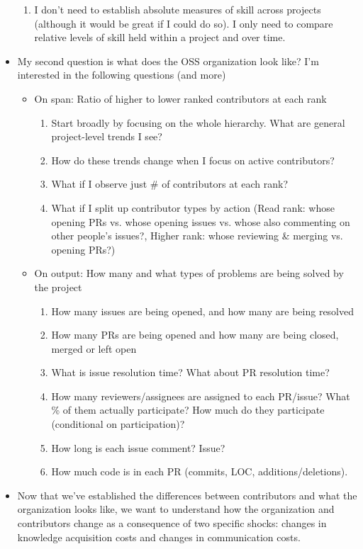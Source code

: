 \documentclass[source/paper/main.tex]{subfiles}
\begin{document}
\begin{itemize}
\begin{enumerate}
        \item I don't need to establish absolute measures of skill across projects (although it would be great if I could do so). I only need to compare relative levels of skill held within a project and over time. 
    \end{enumerate}
    \item My second question is what does the OSS organization look like? I'm interested in the following questions (and more)
    \begin{itemize}
        \item On span: Ratio of higher to lower ranked contributors at each rank
        \begin{enumerate}
            \item Start broadly by focusing on the whole hierarchy. What are general project-level trends I see?
            \item How do these trends change when I focus on active contributors?
            \item What if I observe just \# of contributors at each rank?
            \item What if I split up contributor types by action (Read rank: whose opening PRs vs. whose opening issues vs. whose also commenting on other people's issues?, Higher rank: whose reviewing \& merging vs. opening PRs?)
    \end{enumerate}
        \item On output: How many and what types of problems are being solved by the project
        \begin{enumerate}
            \item How many issues are being opened, and how many are being resolved
            \item How many PRs are being opened and how many are being closed, merged or left open
            \item What is issue resolution time? What about PR resolution time?
            \item How many reviewers/assignees are assigned to each PR/issue? What \% of them actually participate? How much do they participate (conditional on participation)?
            \item How long is each issue comment? Issue? 
            \item How much code is in each PR (commits, LOC, additions/deletions).
    \end{enumerate}
    \end{itemize}
    \item Now that we've established the differences between contributors and what the organization looks like, we want to understand how the organization and contributors change as a consequence of two specific shocks: changes in knowledge acquisition costs and changes in communication costs.

\end{itemize}
\end{document}
